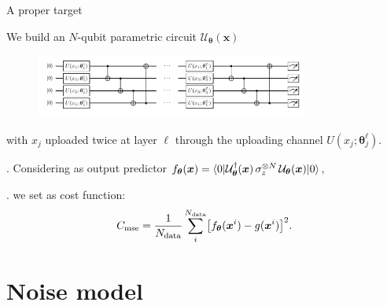 \documentclass[8pt, xcolor={svgnames}, hyperref={linkcolor=black}, aspectratio=169]{beamer}
\newcommand{\equals}{=}
\begin{document}
\begin{frame}{A proper target}
\pause
\begin{tcolorbox}[colback=red!20, title=\faCrosshairs\,\, $N$-dimensional fit: $y \equals g(\bm{x})$]
We build an $N$-qubit parametric circuit $\mathcal{U}_{\bm{\theta}}(\bm{x})$
\begin{figure}
\includegraphics[width=0.8\textwidth]{figures/circ.pdf}
\end{figure}
\vspace{-0.3cm}
with $x_j$ uploaded twice at layer $\ell$ through the uploading channel $U(x_j; \bm{\theta}_j^{\ell})$.
\end{tcolorbox}
\pause
\begin{tcolorbox}[colback=blue!20, title=\faPaypal\,\, Cost function]
. Considering as output predictor $f_{\bm{\theta}}(\bm{x}) = \braket{0|\mathcal{U}_{\bm{\theta}}^{\dagger}(\bm{x})\,
\sigma_z^{\otimes N} \,\mathcal{U}_{\bm{\theta}}(\bm{x})|0}$, 

. we set as cost function:
$$ C_{\rm mse} = \frac{1}{N_{\rm data}}\sum_i^{N_{\rm data}} 
  \bigl[ f_{\bm{\theta}}(\bm{x}^i) - g(\bm{x}^i) \bigr]^2. $$
\end{tcolorbox}
\end{frame}

\section{Noise model}
\end{document}
